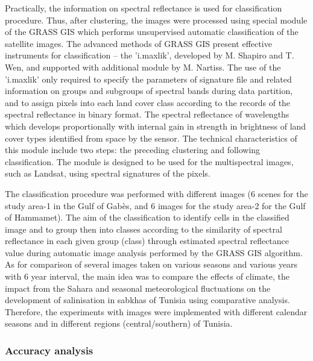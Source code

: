\documentclass[land,article,submit,pdftex,moreauthors]{Definitions/mdpi}
\begin{document}
Practically, the information on spectral reflectance is used for classification procedure. Thus, after clustering, the images were processed using special module of the GRASS GIS which performs unsupervised automatic classification of the satellite images. The advanced methods of GRASS GIS present effective instruments for classification -- the 'i.maxlik', developed by M. Shapiro and T. Wen, and supported with additional module by M. Nartiss. The use of the 'i.maxlik' only required to specify the parameters of signature file and related information on groups and subgroups of spectral bands during data partition, and to assign pixels into each land cover class according to the records of the spectral reflectance in binary format. The spectral reflectance of wavelengths which develops proportionally with internal gain in strength in brightness of land cover types identified from space by the sensor. The technical characteristics of this module include two steps: the preceding clustering and following classification. The module is designed to be used for the multispectral images, such as Landsat, using spectral signatures of the pixels. 

The classification procedure was performed with different images (6 scenes for the study area-1 in the Gulf of Gabès, and 6 images for the study area-2 for the Gulf of Hammamet). The aim of the classification to identify cells in the classified image and to group then into classes according to the similarity of spectral reflectance in each given group (class) through estimated spectral reflectance value during automatic image analysis performed by the GRASS GIS algorithm. As for comparison of several images taken on various seasons and various years with 6 year interval, the main idea was to compare the effects of climate, the impact from the Sahara and seasonal meteorological fluctuations on the development of salinisation in sabkhas of Tunisia using comparative analysis. Therefore, the experiments with images were implemented with different calendar seasons and in different regions (central/southern) of Tunisia. 


 \subsubsection{Accuracy analysis}
\end{document}
